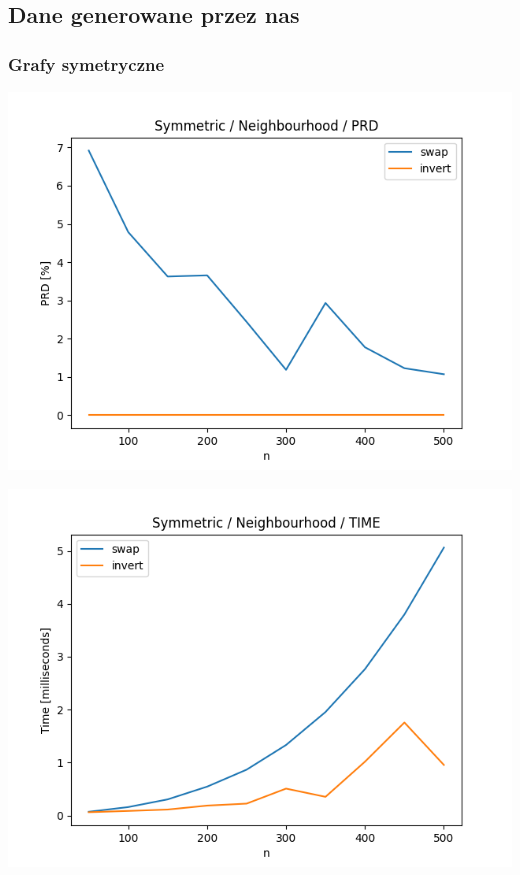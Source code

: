 \documentclass{article}
\begin{document}
\subsection{Dane generowane przez nas}


\subsubsection{Grafy symetryczne}

\begin{center}
\includegraphics[width=\textwidth, 
                   height = 0.4\textheight, 
                   keepaspectratio]
                  {plots/neighbours_symmetric_prd} 
\end{center}

\begin{center}
\includegraphics[width=\textwidth, 
                   height = 0.4\textheight, 
                   keepaspectratio]
                  {plots/neighbours_symmetric_time} 
\end{center}
\end{document}
